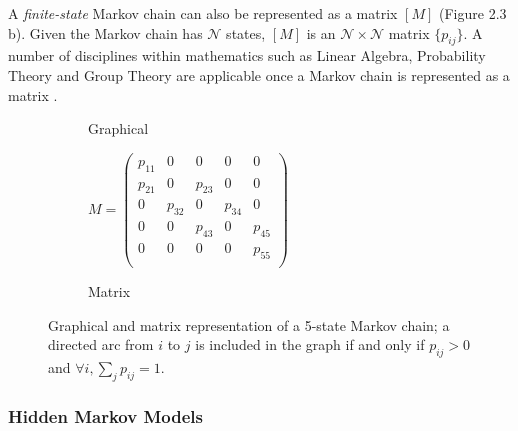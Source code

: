 A  \textit{finite-state} Markov chain can also be represented as a matrix $[M]$ (Figure 2.3 b). Given the Markov chain has $\mathcal{N}$ states, $[M]$ is an $\mathcal{N} \times \mathcal{N}$  matrix $\{p_{ij}\}$. A number of disciplines within mathematics such as Linear Algebra, Probability Theory and Group Theory are applicable once a Markov chain is represented as a matrix \cite{gallager}.

\begin{figure}[h]
\begin{subfigure}{0.40\textwidth}
\centering
{}
\caption{Graphical}
\label{fig:horse}
\end{subfigure} \hspace{0.2\textwidth}
\begin{subfigure}{0.40\textwidth}
\centering
\small
\(
M=
\begin{pmatrix}
p_{11}&0&0&0&0 \\
p_{21}&0&p_{23}&0&0 \\
0&p_{32}&0&p_{34}&0 \\
0&0&p_{43}&0&p_{45} \\
0&0&0&0&p_{55} \\
\end{pmatrix}
\)
\label{fig:zebra}
\caption{Matrix}
\end{subfigure}
\caption{Graphical and matrix representation of a 5-state Markov chain; a directed arc from $i$ to $j$ is included in the graph if and only if $p_{ij} > 0$ and $\forall i, \sum_{j} p_{ij} = 1$.}
\label{fig:animals}
\end{figure}


\subsubsection{Hidden Markov Models}

